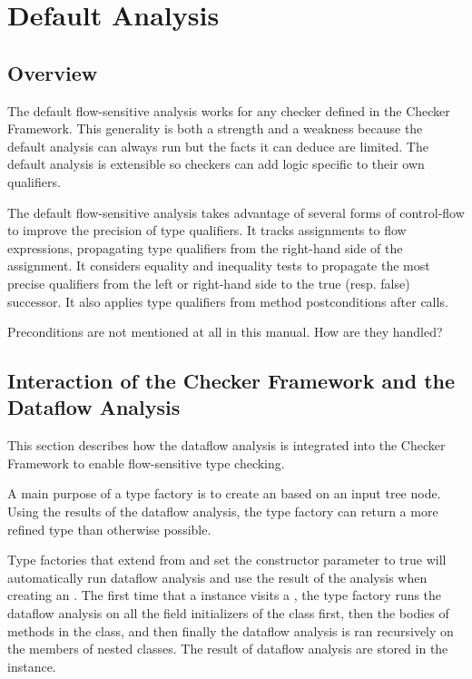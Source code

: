 \section{Default Analysis}


\subsection{Overview}

The default flow-sensitive analysis 
works for any checker defined in the
Checker Framework.  This generality is both a strength and a weakness
because the default analysis can always run but the facts it can
deduce are limited.  The default analysis is extensible so checkers
can add logic specific to their own qualifiers.

The default flow-sensitive analysis takes advantage of several forms
of control-flow to improve the precision of type qualifiers.  It
tracks assignments to flow expressions, propagating type qualifiers
from the right-hand side of the assignment.  It considers equality and
inequality tests to propagate the most precise qualifiers from the
left or right-hand side to the true (resp. false) successor.  It also
applies type qualifiers from method postconditions after calls.

\begin{workinprogress}
Preconditions are not mentioned at all in this manual. How are they handled?
\end{workinprogress}


\subsection{Interaction of the Checker Framework and the Dataflow Analysis}
\label{sec:flow-cf-interaction}

This section describes how the dataflow analysis is integrated into the
Checker Framework to enable flow-sensitive type checking.

A main purpose of a type factory is to create an 
based on an input tree node. Using the results of the dataflow analysis,
the type factory can return a more refined type than otherwise possible.

Type factories that extend from 
and set the constructor parameter  to true will automatically
run dataflow analysis and use the result of the analysis when creating an
.  The first time that a 
instance visits a , the type factory runs the dataflow analysis on all the field initializers of the class first, then the bodies of methods in
the class, and then finally the dataflow analysis is
ran recursively on the members of nested classes. The result of
dataflow analysis are stored in the  instance.

